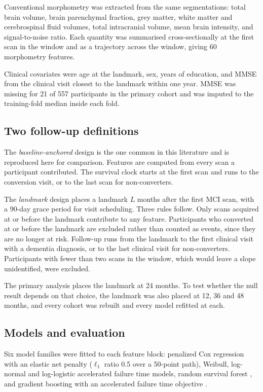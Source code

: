 \documentclass[blue]{ludusofficial}
\begin{document}
Conventional morphometry was extracted from the same segmentations: total brain volume, brain parenchymal fraction, grey matter, white matter and cerebrospinal fluid volumes, total intracranial volume, mean brain intensity, and signal-to-noise ratio. Each quantity was summarised cross-sectionally at the first scan in the window and as a trajectory across the window, giving 60 morphometry features.

Clinical covariates were age at the landmark, sex, years of education, and MMSE from the clinical visit closest to the landmark within one year. MMSE was missing for 21 of 557 participants in the primary cohort and was imputed to the training-fold median inside each fold.

\subsection{Two follow-up definitions}

The \textit{baseline-anchored} design is the one common in this literature and is reproduced here for comparison. Features are computed from every scan a participant contributed. The survival clock starts at the first scan and runs to the conversion visit, or to the last scan for non-converters.

The \textit{landmark} design places a landmark $L$ months after the first MCI scan, with a 90-day grace period for visit scheduling. Three rules follow. Only scans acquired at or before the landmark contribute to any feature. Participants who converted at or before the landmark are excluded rather than counted as events, since they are no longer at risk. Follow-up runs from the landmark to the first clinical visit with a dementia diagnosis, or to the last clinical visit for non-converters. Participants with fewer than two scans in the window, which would leave a slope unidentified, were excluded.

The primary analysis places the landmark at 24 months. To test whether the null result depends on that choice, the landmark was also placed at 12, 36 and 48 months, and every cohort was rebuilt and every model refitted at each.

\subsection{Models and evaluation}

Six model families were fitted to each feature block: penalized Cox regression with an elastic net penalty ($\ell_1$ ratio 0.5 over a 50-point path), Weibull, log-normal and log-logistic accelerated failure time models, random survival forest \cite{ishwaran2008rsf}, and gradient boosting with an accelerated failure time objective \cite{chen2016xgboost, barnwal2022survivalxgb}.
\end{document}
